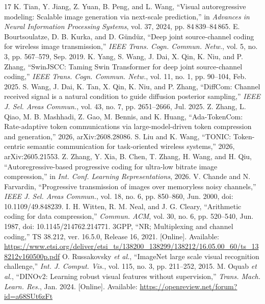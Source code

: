 \begin{thebibliography}{17}
 K. Tian, Y. Jiang, Z. Yuan, B. Peng, and L. Wang, ``Visual autoregressive modeling: Scalable image generation via next-scale prediction,'' in \emph{Advances in Neural Information Processing Systems}, vol. 37, 2024, pp. 84\,839--84\,865.
 E. Bourtsoulatze, D. B. Kurka, and D. G\"und\"uz, ``Deep joint source-channel coding for wireless image transmission,'' \emph{IEEE Trans. Cogn. Commun. Netw.}, vol. 5, no. 3, pp. 567--579, Sep. 2019.
 K. Yang, S. Wang, J. Dai, X. Qin, K. Niu, and P. Zhang, ``SwinJSCC: Taming Swin Transformer for deep joint source-channel coding,'' \emph{IEEE Trans. Cogn. Commun. Netw.}, vol. 11, no. 1, pp. 90--104, Feb. 2025.
 S. Wang, J. Dai, K. Tan, X. Qin, K. Niu, and P. Zhang, ``DiffCom: Channel received signal is a natural condition to guide diffusion posterior sampling,'' \emph{IEEE J. Sel. Areas Commun.}, vol. 43, no. 7, pp. 2651--2666, Jul. 2025.
 Z. Zhang, L. Qiao, M. B. Mashhadi, Z. Gao, M. Bennis, and K. Huang, ``Ada-TokenCom: Rate-adaptive token communications via large-model-driven token compression and generation,'' 2026, arXiv:2608.28086.
 S. Liu and K. Wang, ``TONIC: Token-centric semantic communication for task-oriented wireless systems,'' 2026, arXiv:2605.21553.
 Z. Zhang, Y. Xia, B. Chen, T. Zhang, H. Wang, and H. Qiu, ``Autoregressive-based progressive coding for ultra-low bitrate image compression,'' in \emph{Int. Conf. Learning Representations}, 2026.
 V. Chande and N. Farvardin, ``Progressive transmission of images over memoryless noisy channels,'' \emph{IEEE J. Sel. Areas Commun.}, vol. 18, no. 6, pp. 850--860, Jun. 2000, doi: 10.1109/49.848239.
 I. H. Witten, R. M. Neal, and J. G. Cleary, ``Arithmetic coding for data compression,'' \emph{Commun. ACM}, vol. 30, no. 6, pp. 520--540, Jun. 1987, doi: 10.1145/214762.214771.
 3GPP, ``NR; Multiplexing and channel coding,'' TS 38.212, ver. 16.5.0, Release 16, 2021. [Online]. Available: \url{https://www.etsi.org/deliver/etsi_ts/138200_138299/138212/16.05.00_60/ts_138212v160500p.pdf}
 O. Russakovsky \emph{et al.}, ``ImageNet large scale visual recognition challenge,'' \emph{Int. J. Comput. Vis.}, vol. 115, no. 3, pp. 211--252, 2015.
 M. Oquab \emph{et al.}, ``DINOv2: Learning robust visual features without supervision,'' \emph{Trans. Mach. Learn. Res.}, Jan. 2024. [Online]. Available: \url{https://openreview.net/forum?id=a68SUt6zFt}

\end{thebibliography}
